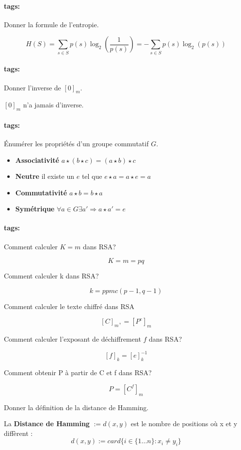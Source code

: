 \documentclass[12pt]{article}
\newcommand*{\xfield}[1]{\begin{mdframed}\centering #1\end{mdframed}\bigskip}
\newenvironment{note}{}{}
\newcommand*{\tags}[1]{\paragraph{tags: }#1}
\begin{document}
\begin{note}
	\tags{}
	\xfield{
		Donner la formule de l'entropie.	
	}
	\xfield{
		$$H(S) = \sum\limits_{s \in S} p(s)\log_2\left(\frac{1}{p(s)}\right) = -\sum\limits_{s \in S} p(s)\log_2(p(s))$$	
	}
\end{note}

\begin{note}
	\tags{}
	\xfield{
		Donner l'inverse de $[0]_m$.
	}
	\xfield{
		$[0]_m$ n'a jamais d'inverse.
	}
\end{note}

\begin{note}
	\tags{}
	\xfield{
		Énumérer les propriétés d'un groupe commutatif $G$.
	}
	\xfield{
		\begin{itemize}
		\item \textbf{Associativité} $a \star (b \star c) = (a \star b) \star c$
		\item \textbf{Neutre} il existe un $e$ tel que $e \star a = a \star e = a$
		\item \textbf{Commutativité} $a \star b = b \star a$
		\item \textbf{Symétrique} $\forall a \in G \exists a' \Rightarrow a \star a' = e$
		\end{itemize}
	}
\end{note}

\begin{note}
	\tags{}
	\xfield{
		Comment calculer $K = m$ dans RSA?
	}
	\xfield{
		$$K = m = pq$$
	}
\end{note}

\begin{note}
\xfield{Comment calculer k dans RSA?}
\xfield{$$k = ppmc(p-1,q-1)$$}
\end{note}

\begin{note}
\xfield{Comment calculer le texte chiffré dans RSA}
\xfield{$$[C]_m, = [P^{e}]_m$$}
\end{note}

\begin{note}
\xfield{Comment calculer l'exposant de déchiffrement $f$ dans RSA?}
\xfield{$$[f]_k = [e]_{k}^{-1}$$}
\end{note}

\begin{note}
\xfield{Comment obtenir P à partir de C et f dans RSA?}
\xfield{$$P = [C^f]_m$$}
\end{note}

\begin{note}
\xfield{Donner la définition de la distance de Hamming.}
\xfield{La \textbf{Distance de Hamming} $:= d(x,y)$ est le nombre de positions où x et y diffèrent : \
$$d(x,y) := card\{i \in \{1...n\} : x_i \neq y_i\}$$
}
\end{note}
\end{document}
